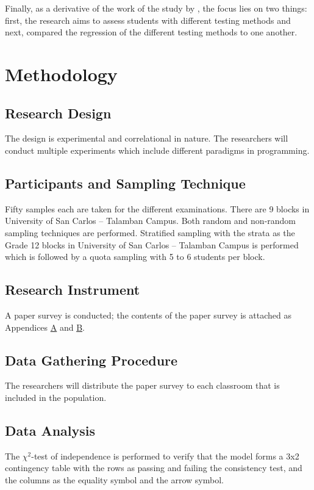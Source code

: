 \documentclass[12pt]{article}
\begin{document}
Finally, as a derivative of the work of the study by \cite{dehnadi2006camel}, 
the focus lies on two things: 
first, the research aims to assess students with different testing methods and 
next, compared the regression of the different testing methods to one another.


\printglossaries

\section{Methodology}
\label{sec:orgc8d1077}
\subsection{Research Design}
\label{sec:orgfb0af84}
The design is experimental and correlational in nature.  
The researchers will conduct multiple experiments which include different paradigms in programming. 

\subsection{Participants and Sampling Technique}
\label{sec:org5edf992}
Fifty samples each are taken for the different examinations. 
There are 9 blocks in University of San Carlos -- Talamban Campus.
Both random and non-random sampling techniques are performed. 
Stratified sampling with the strata as the Grade 12 blocks in University of San Carlos -- Talamban Campus is performed
which is followed by a quota sampling with 5 to 6 students per block.

\subsection{Research Instrument}
\label{sec:org3595987}
A paper survey is conducted; 
the contents of the paper survey is attached as Appendices \hyperref[sec:org6a8f1f8]{A} and \hyperref[sec:org8500dc1]{B}.

\subsection{Data Gathering Procedure}
\label{sec:orgfda1532}
The researchers will distribute the paper survey to each classroom that is included in the population. 

\subsection{Data Analysis}
\label{sec:orgd854143}
The \(\chi^{\text{2}}\)-test of independence is performed to verify that 
the model forms a 3x2 contingency table 
with the rows as passing and failing the consistency test,
and the columns as the equality symbol and the arrow symbol.
\end{document}
